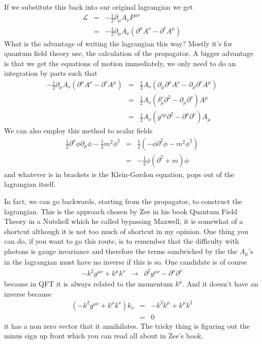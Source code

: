 \documentclass[aps,preprint,preprintnumbers,nofootinbib,showpacs,prd]{revtex4-1}
\newcommand{\nbea}{\begin{eqnarray*}}
\newcommand{\neea}{\end{eqnarray*}}
\begin{document}
If we substitute this back into our original lagrangian we get
%
\nbea
\mathcal{L} & = & -\frac{1}{2} \partial_\mu A_\nu F^{\mu\nu}\\
& = & -\frac{1}{2} \partial_\mu A_\nu  \left ( \partial^\mu A^\nu  - \partial^\nu A^\mu \right )
\neea
%
What is the advantage of writing the lagrangian this way? Mostly it's for quantum field theory use, the calculation of the propagator. A bigger advantage is that we get the equations of motion immediately, we only need to do an integration by parts such that
%
\nbea
-\frac{1}{2} \partial_\mu A_\nu  \left ( \partial^\mu A^\nu  - \partial^\nu A^\mu \right ) & = & \frac{1}{2} A_\nu  \left ( \partial_\mu\partial^\mu A^\nu  - \partial_\mu\partial^\nu A^\mu \right ) \\
& = & \frac{1}{2} A_\nu  \left ( \delta^\nu_\mu \partial^2 - \partial_\mu\partial^\nu \right ) A^\mu \\
& = & \frac{1}{2} A_\nu  \left ( g^{\nu\mu} \partial^2 - \partial^\mu\partial^\nu \right ) A_\mu
\neea
%
We can also employ this method to scalar fields
%
\nbea
\frac{1}{2} \partial^\mu \phi \partial_\mu \phi - \frac{1}{2} m^2 \phi^2 & = & \frac{1}{2}(-\phi \partial^2 \phi - m^2 \phi^2) \\
& = & -\frac{1}{2} \phi(\partial^2 + m)\phi
\neea
%
and whatever is in brackets is the Klein-Gordon equation, pops out of the lagrangian itself.

In fact, we can go backwards, starting from the propagator, to construct the lagrangian. This is the approach chosen by Zee in his book Quantum Field Theory in a Nutshell which he called bypassing Maxwell, it is somewhat of a shortcut although it is not too much of shortcut in my opinion. One thing you can do, if you want to go this route, is to remember that the difficulty with photons is gauge invariance and therefore the terms sandwiched by the the $A_\mu$'s in the lagrangian must have no inverse if this is so. One candidate is of course
%
\nbea
-k^2 g^{\mu\nu} + k^\mu k^\nu & \to & \partial^2 g^{\mu\nu} - \partial^\mu \partial^\nu
\neea
%
because in QFT it is always related to the momentum $k^\mu$. And it doesn't have an inverse because
%
\nbea
(-k^2 g^{\mu\nu} + k^\mu k^\nu)k_\nu & = & -k^2 k^\mu + k^\mu k^2 \\
& = & 0
\neea
%
it has a non zero vector that it annihilates. The tricky thing is figuring out the minus sign up front which you can read all about in Zee's book.
\end{document}
